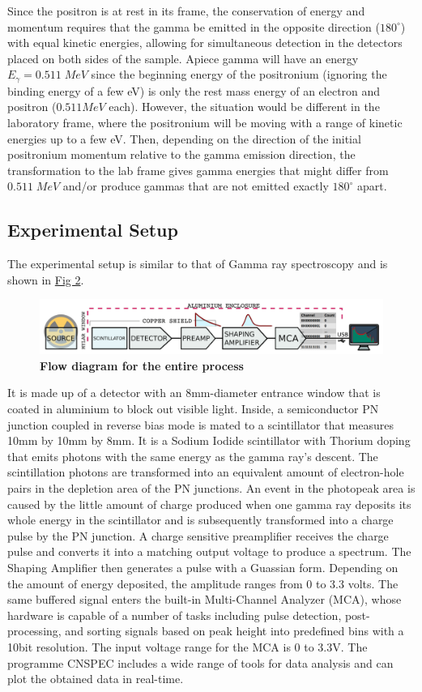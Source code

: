 		Since the positron is at rest in its frame, the conservation of energy and momentum requires that the gamma be emitted in the opposite direction ($180^\circ$) with equal kinetic energies, allowing for simultaneous detection in the detectors placed on both sides of the sample. Apiece gamma will have an energy $E_{\gamma} = 0.511\; MeV$ since the beginning energy of the positronium (ignoring the binding energy of a few eV) is only the rest mass energy of an electron and positron ($0.511MeV$ each). However, the situation would be different in the laboratory frame, where the positronium will be moving with a range of kinetic energies up to a few eV. Then, depending on the direction of the initial positronium momentum relative to the gamma emission direction, the transformation to the lab frame gives gamma energies that might differ from $0.511\;MeV$ and/or produce gammas that are not emitted exactly $180^\circ$ apart.

	\subsection{Experimental Setup}
		The experimental setup is similar to that of Gamma ray spectroscopy and is shown in \hyperref[fig:2]{Fig 2}. 
		\begin{figure}[h]
			\centering
			\includegraphics[width=0.9\columnwidth]{images/theory2.png}
			\caption{\textbf{\small{Flow diagram for the entire process}}}
			\label{fig:2}
		\end{figure}

		It is made up of a detector with an 8mm-diameter entrance window that is coated in aluminium to block out visible light. Inside, a semiconductor PN junction coupled in reverse bias mode is mated to a scintillator that measures 10mm by 10mm by 8mm. It is a Sodium Iodide scintillator with Thorium doping that emits photons with the same energy as the gamma ray's descent. The scintillation photons are transformed into an equivalent amount of electron-hole pairs in the depletion area of the PN junctions. An event in the photopeak area is caused by the little amount of charge produced when one gamma ray deposits its whole energy in the scintillator and is subsequently transformed into a charge pulse by the PN junction. A charge sensitive preamplifier receives the charge pulse and converts it into a matching output voltage to produce a spectrum. The Shaping Amplifier then generates a pulse with a Guassian form. Depending on the amount of energy deposited, the amplitude ranges from 0 to 3.3 volts. The same buffered signal enters the built-in Multi-Channel Analyzer (MCA), whose hardware is capable of a number of tasks including pulse detection, post-processing, and sorting signals based on peak height into predefined bins with a 10bit resolution. The input voltage range for the MCA is 0 to 3.3V. The programme CNSPEC includes a wide range of tools for data analysis and can plot the obtained data in real-time.

